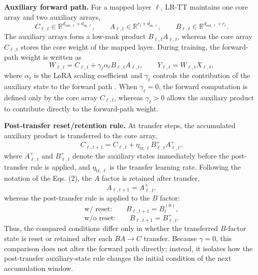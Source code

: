 \documentclass[fleqn,10pt]{wlscirep}
\begin{document}
\noindent\textbf{Auxiliary forward path.}
For a mapped layer \(\ell\), LR-TT maintains one core array and two auxiliary arrays,
\begin{equation}
C_{\ell,t}\in\mathbb{R}^{d_{\mathrm{out},\ell}\times d_{\mathrm{in},\ell}},
\qquad
A_{\ell,t}\in\mathbb{R}^{r_\ell\times d_{\mathrm{in},\ell}},
\qquad
B_{\ell,t}\in\mathbb{R}^{d_{\mathrm{out},\ell}\times r_\ell}.
\label{eq:S4_state_definition}
\end{equation}
The auxiliary arrays form a low-rank product \(B_{\ell,t}A_{\ell,t}\), whereas the core array \(C_{\ell,t}\) stores the core weight of the mapped layer. During training, the forward-path weight is written as
\begin{equation}
W_{\ell,t}
=
C_{\ell,t}
+
\gamma_\ell \alpha_\ell B_{\ell,t}A_{\ell,t},
\qquad
Y_{\ell,t}=W_{\ell,t}X_{\ell,t},
\label{eq:S4_aux_forward}
\end{equation}
where \(\alpha_\ell\) is the LoRA scaling coefficient and \(\gamma_\ell\) controls the contribution of the auxiliary state to the forward path \cite{gokmen2020tikitaka,hu2021lora}. When \(\gamma_\ell=0\), the forward computation is defined only by the core array \(C_{\ell,t}\), whereas \(\gamma_\ell>0\) allows the auxiliary product to contribute directly to the forward-path weight.

\noindent\textbf{Post-transfer reset/retention rule.}
At transfer steps, the accumulated auxiliary product is transferred to the core array,
\begin{equation}
C_{\ell,t+1}
=
C_{\ell,t}
+
\eta_{\mathrm{tr},\ell}B_{\ell,t}^{+}A_{\ell,t}^{+},
\label{eq:S4_core_transfer}
\end{equation}
where \(A_{\ell,t}^{+}\) and \(B_{\ell,t}^{+}\) denote the auxiliary states immediately before the post-transfer rule is applied, and \(\eta_{\mathrm{tr},\ell}\) is the transfer learning rate. Following the notation of the Eqs. (2), the \(A\) factor is retained after transfer,
\begin{equation}
A_{\ell,t+1}=A_{\ell,t}^{+},
\label{eq:S4_post_A}
\end{equation}
whereas the post-transfer rule is applied to the \(B\) factor:
\begin{equation}
\text{w/ reset:}
\qquad
B_{\ell,t+1}=B_{\ell}^{(0)},
\label{eq:S4_reset_rule}
\end{equation}
\begin{equation}
\text{w/o reset:}
\qquad
B_{\ell,t+1}=B_{\ell,t}^{+}.
\label{eq:S4_nonreset_rule}
\end{equation}
Thus, the compared conditions differ only in whether the transferred \(B\)-factor state is reset or retained after each \(BA\rightarrow C\) transfer. Because \(\gamma=0\), this comparison does not alter the forward path directly; instead, it isolates how the post-transfer auxiliary-state rule changes the initial condition of the next accumulation window.
\end{document}
